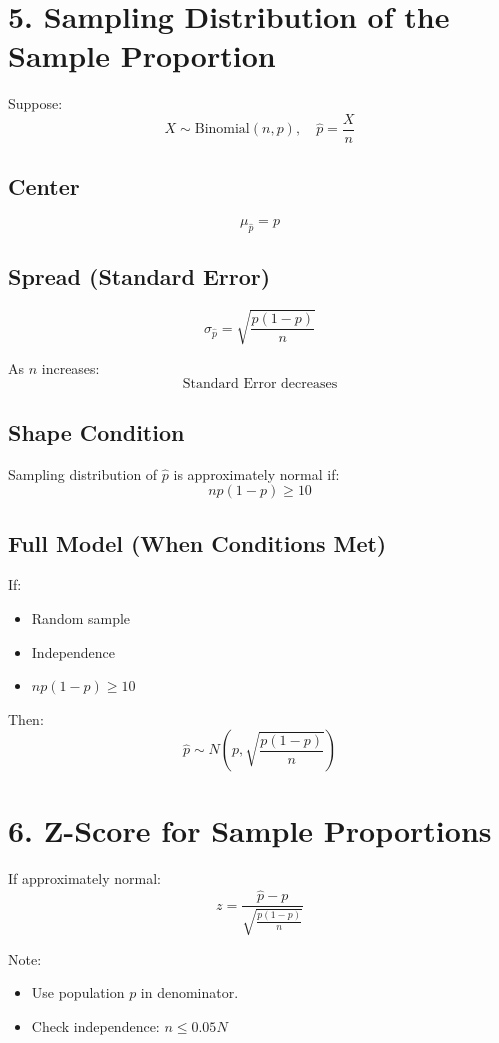 \documentclass{article}
\begin{document}
\bigskip

\section*{5. Sampling Distribution of the Sample Proportion}

Suppose:
\[
X \sim \text{Binomial}(n, p), \quad \hat{p} = \frac{X}{n}
\]

\subsection*{Center}
\[
\mu_{\hat{p}} = p
\]

\subsection*{Spread (Standard Error)}
\[
\sigma_{\hat{p}} =
\sqrt{\frac{p(1-p)}{n}}
\]

As $n$ increases:
\[
\text{Standard Error decreases}
\]

\subsection*{Shape Condition}

Sampling distribution of $\hat{p}$ is approximately normal if:
\[
np(1-p) \ge 10
\]

\subsection*{Full Model (When Conditions Met)}

If:
\begin{itemize}
\item Random sample
\item Independence
\item $np(1-p) \ge 10$
\end{itemize}

Then:
\[
\hat{p} \sim
N\left(p, \sqrt{\frac{p(1-p)}{n}}\right)
\]

\bigskip

\section*{6. Z-Score for Sample Proportions}

If approximately normal:
\[
z =
\frac{\hat{p} - p}
{\sqrt{\frac{p(1-p)}{n}}}
\]

Note:
\begin{itemize}
\item Use population $p$ in denominator.
\item Check independence: $n \le 0.05N$
\end{itemize}
\end{document}
